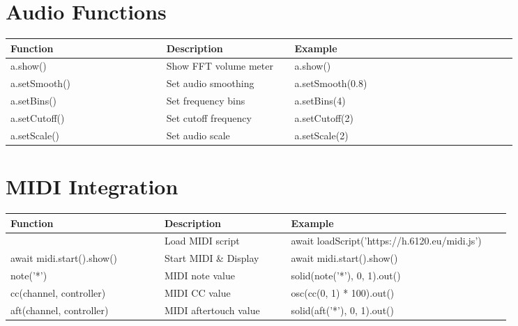 \documentclass[9pt,oneside]{amsart}
\begin{document}
\section*{Audio Functions}
\begin{tabular}{L{0.28\linewidth}L{0.23\linewidth}L{0.40\linewidth}}
\toprule
\textbf{Function} & \textbf{Description} & \textbf{Example} \\
\midrule
a.show() & Show FFT volume meter & a.show() \\
a.setSmooth() & Set audio smoothing & a.setSmooth(0.8) \\
a.setBins() & Set frequency bins & a.setBins(4) \\
a.setCutoff() & Set cutoff frequency & a.setCutoff(2) \\
a.setScale() & Set audio scale & a.setScale(2) \\
\bottomrule
\end{tabular}

\section*{MIDI Integration}
\begin{tabular}{L{0.28\linewidth}L{0.23\linewidth}L{0.40\linewidth}}
\toprule
\textbf{Function} & \textbf{Description} & \textbf{Example} \\
\midrule
 & Load MIDI script & await loadScript('https://h.6120.eu/midi.js') \\
await midi.start().show() & Start MIDI \& Display & await midi.start().show() \\
note('*') & MIDI note value & solid(note('*'), 0, 1).out() \\
cc(channel, controller) & MIDI CC value & osc(cc(0, 1) * 100).out() \\
aft(channel, controller) & MIDI aftertouch value & solid(aft('*'), 0, 1).out() \\
\bottomrule
\end{tabular}
\end{document}
